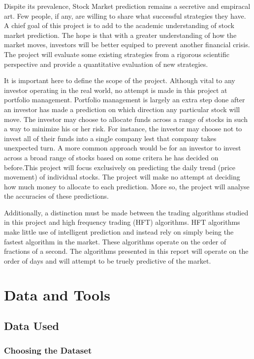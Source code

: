 \documentclass{report}
\begin{document}
Dispite its prevalence, Stock Market prediction remains a secretive and empiracal art. Few people, if any, are willing to share what  successful strategies they have. A chief goal of this project is to add to the academic understanding of stock market prediction. The hope is that with a greater understanding of how the market moves, investors will be better equiped to prevent another financial crisis. The project will evaluate some existing strategies from a rigorous scientific perspective and provide a quantitative evaluation of new strategies. 

It is important here to define the scope of the project. Although vital to any investor operating in the real world, no attempt is made in this project at portfolio management. Portfolio management is largely an extra step done after an investor has made a prediction on which direction any particular stock will move. The investor may choose to allocate funds across a range of stocks in such a way to minimize his or her risk. For instance, the investor may choose not to invest all of their funds into a single company lest that company takes unexpected turn. A more common approach would be for an investor to invest across a broad range of stocks based on some critera he has decided on before.This project will focus exclusively on predicting the daily trend (price movement) of individual stocks. The project will make no attempt at deciding how much money to allocate to each prediction.  More so, the project will analyse the accuracies of these predictions. 

Additionally, a distinction must be made between the trading algorithms studied in this project and high frequency trading (HFT) algorithms. HFT algorithms make little use of intelligent prediction and instead rely on simply being the fastest algorithm in the market. These algorithms operate on the order of fractions of a second. The algorithms presented in this report will operate on the order of days and will attempt to be truely predictive of the market.  

\chapter{Data and Tools}

\section{Data Used}

\subsection{Choosing the Dataset}
\end{document}

